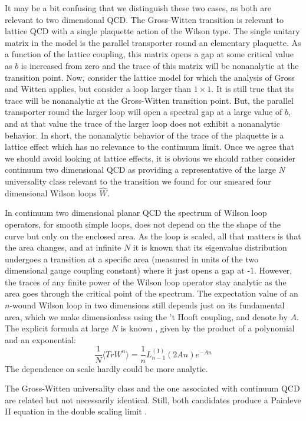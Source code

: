 It may be a bit confusing that we distinguish these two cases, as
both are relevant to two dimensional QCD. The Gross-Witten
transition is relevant to lattice QCD with a single plaquette
action of the Wilson type.
The single
unitary matrix in the model is the parallel transporter round an
elementary plaquette. As a function of the lattice coupling,
this matrix opens a gap at
some critical value as $b$ is increased from zero and the
trace of this matrix will be nonanalytic at the transition point.
Now, consider the lattice model for which the
analysis of Gross and Witten applies, but consider a loop
larger than $1\times 1$. It is still true that its trace will be
nonanalytic at the Gross-Witten transition point. But,
the parallel transporter
round the larger loop will open a spectral gap at a
large value of $b$, and at that value the trace of the larger loop
does not exhibit a nonanalytic behavior. In short, the nonanalytic
behavior of the trace of the plaquette is a lattice effect which
has no relevance to the continuum limit. Once we agree that we
should avoid looking at lattice effects, it is obvious we should
rather consider continuum two dimensional QCD as providing a
representative of the large $N$ universality class relevant to the
transition we found for our smeared four dimensional Wilson loops
${\hat W}$.

In continuum two dimensional planar QCD the spectrum of Wilson
loop operators, for smooth simple loops, does not depend on the
the shape of the curve but only on the enclosed area. As the loop
is scaled, all that matters is that the area changes, and at
infinite $N$ it is known that its eigenvalue distribution
undergoes a transition at a specific area (measured in units of
the two dimensional gauge coupling constant) where it just opens a
gap at -1. However, the traces of any finite power of the Wilson
loop operator stay analytic as the area goes through the critical
point of the spectrum. The expectation value of an $n$-wound
Wilson loop in two dimensions still depends just on its
fundamental area, which we make dimensionless using the 't Hooft
coupling, and denote by $A$. The explicit formula at large $N$ is
known \cite{KKwloop145}, given by the product of a polynomial and
an exponential:
\begin{equation}
\frac{1}{N}\langle Tr { W^n } \rangle = \frac{1}{n} L_{n-1}^{(1)}
( 2A n) e^{-An}
\label{twodwil}
\end{equation}
The dependence on scale hardly could be more analytic.


The Gross-Witten universality class and the one associated with
continuum QCD are related but not necessarily identical. Still,
both candidates produce a Painleve II equation in the double
scaling limit \cite{peris, gross-mat}.


